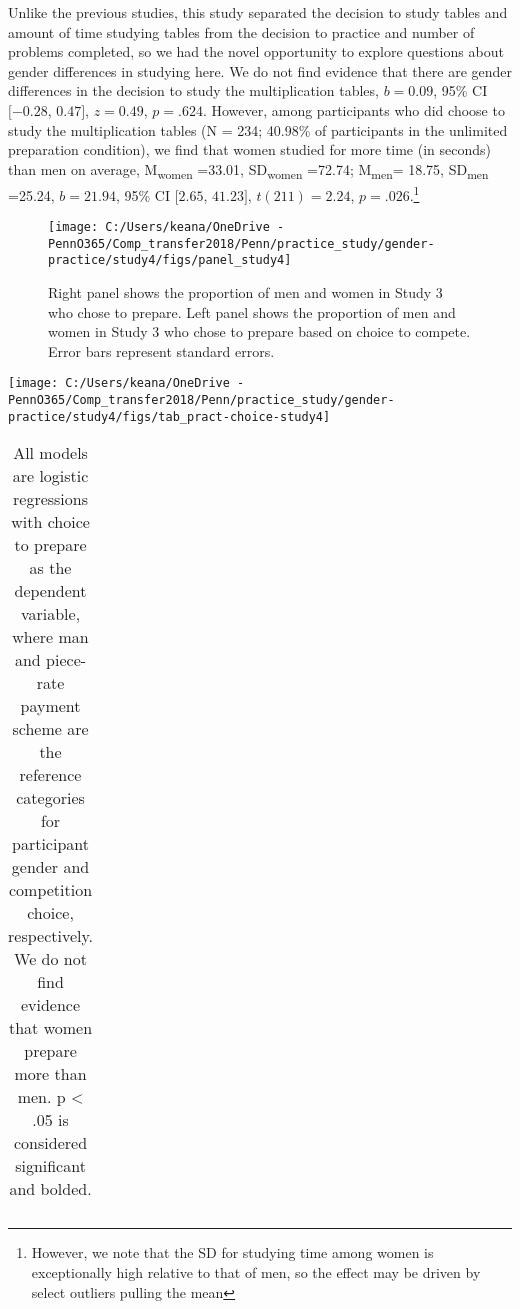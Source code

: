 \documentclass[letterpaper, nobind]{templates/ociamthesis}
\begin{document}
Unlike the previous studies, this study separated the decision to study tables and amount of time studying tables from the decision to practice and number of problems completed, so we had the novel opportunity to explore questions about gender differences in studying here. We do not find evidence that there are gender differences in the decision to study the multiplication tables, \(b = 0.09\), 95\% CI \([-0.28\), \(0.47]\), \(z = 0.49\), \(p = .624\). However, among participants who did choose to study the multiplication tables (N = 234; 40.98\% of participants in the unlimited preparation condition), we find that women studied for more time (in seconds) than men on average, M\textsubscript{women} =33.01, SD\textsubscript{women} =72.74; M\textsubscript{men}= 18.75, SD\textsubscript{men} =25.24, \(b = 21.94\), 95\% CI \([2.65\), \(41.23]\), \(t(211) = 2.24\), \(p = .026\).\footnote{However, we note that the SD for studying time among women is exceptionally high relative to that of men, so the effect may be driven by select outliers pulling the mean}

\begin{figure}

{\centering \texttt{[image: C:/Users/keana/OneDrive - PennO365/Comp\_transfer2018/Penn/practice\_study/gender-practice/study4/figs/panel\_study4]} 

}

\caption{Right panel shows the proportion of men and women in Study 3 who chose to prepare. Left panel shows the proportion of men and women in Study 3 who chose to prepare based on choice to compete. Error bars represent standard errors.}\label{fig:panel-study4}
\end{figure}

\begin{center}\texttt{[image: C:/Users/keana/OneDrive - PennO365/Comp\_transfer2018/Penn/practice\_study/gender-practice/study4/figs/tab\_pract-choice-study4]} \end{center}

\begin{table}[ht]
\centering
\begingroup\fontsize{0.1pt}{0.1pt}\selectfont
\begin{tabular}{r}
   \\ 
 \end{tabular}
\endgroup
\caption{All models are logistic regressions with choice to prepare as the dependent variable, where man and piece-rate payment scheme are the reference categories for participant gender and competition choice, respectively. We do not find evidence that women prepare more than men. p < .05 is considered significant and bolded.} 
\label{tab:tab-pract-choice-study4}
\end{table}
\end{document}
